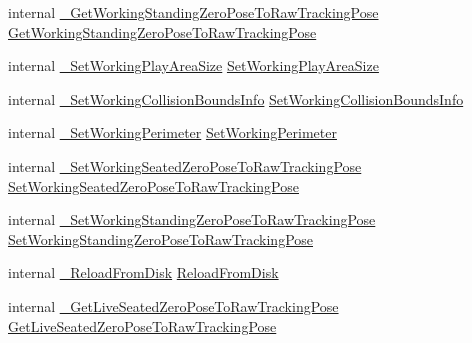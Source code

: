 \begin{DoxyCompactItemize}
internal \mbox{\hyperlink{struct_valve_1_1_v_r_1_1_i_v_r_chaperone_setup_a45b2110871b615dbde696e6f11cfedba}{\+\_\+\+Get\+Working\+Standing\+Zero\+Pose\+To\+Raw\+Tracking\+Pose}} \mbox{\hyperlink{struct_valve_1_1_v_r_1_1_i_v_r_chaperone_setup_a60bd7d96476f3b391250eb3700074fd9}{Get\+Working\+Standing\+Zero\+Pose\+To\+Raw\+Tracking\+Pose}}
\item 
internal \mbox{\hyperlink{struct_valve_1_1_v_r_1_1_i_v_r_chaperone_setup_a554b0b7e6b9be23e238594f517ed9890}{\+\_\+\+Set\+Working\+Play\+Area\+Size}} \mbox{\hyperlink{struct_valve_1_1_v_r_1_1_i_v_r_chaperone_setup_a0f9b6d7a6fbb50e81f9004e19c423327}{Set\+Working\+Play\+Area\+Size}}
\item 
internal \mbox{\hyperlink{struct_valve_1_1_v_r_1_1_i_v_r_chaperone_setup_a1826d10332305d4c90afaf2949c8b5ce}{\+\_\+\+Set\+Working\+Collision\+Bounds\+Info}} \mbox{\hyperlink{struct_valve_1_1_v_r_1_1_i_v_r_chaperone_setup_aa1deb1f74bcff51bfa63537978e51ff0}{Set\+Working\+Collision\+Bounds\+Info}}
\item 
internal \mbox{\hyperlink{struct_valve_1_1_v_r_1_1_i_v_r_chaperone_setup_ad35ac33bfa800e014d9b1a6bac63e1db}{\+\_\+\+Set\+Working\+Perimeter}} \mbox{\hyperlink{struct_valve_1_1_v_r_1_1_i_v_r_chaperone_setup_a5d94d0c27aed104f0fda458684e01da5}{Set\+Working\+Perimeter}}
\item 
internal \mbox{\hyperlink{struct_valve_1_1_v_r_1_1_i_v_r_chaperone_setup_a5190c3da2ff9e625deae3ebdb2deeb0b}{\+\_\+\+Set\+Working\+Seated\+Zero\+Pose\+To\+Raw\+Tracking\+Pose}} \mbox{\hyperlink{struct_valve_1_1_v_r_1_1_i_v_r_chaperone_setup_a229d3d0d3d13769b5623060d2413e363}{Set\+Working\+Seated\+Zero\+Pose\+To\+Raw\+Tracking\+Pose}}
\item 
internal \mbox{\hyperlink{struct_valve_1_1_v_r_1_1_i_v_r_chaperone_setup_a7cc1138b7593b23c7ac311cb1ecacb1f}{\+\_\+\+Set\+Working\+Standing\+Zero\+Pose\+To\+Raw\+Tracking\+Pose}} \mbox{\hyperlink{struct_valve_1_1_v_r_1_1_i_v_r_chaperone_setup_a846b5d6c65aeab963b4c856e9e6c0b28}{Set\+Working\+Standing\+Zero\+Pose\+To\+Raw\+Tracking\+Pose}}
\item 
internal \mbox{\hyperlink{struct_valve_1_1_v_r_1_1_i_v_r_chaperone_setup_aa5b1db0ac77ec3ffab299ca848375c98}{\+\_\+\+Reload\+From\+Disk}} \mbox{\hyperlink{struct_valve_1_1_v_r_1_1_i_v_r_chaperone_setup_a389e7012138dc474386b60abd984aee7}{Reload\+From\+Disk}}
\item 
internal \mbox{\hyperlink{struct_valve_1_1_v_r_1_1_i_v_r_chaperone_setup_a2e6aaeb62d03003acf2b93f46f82c0cf}{\+\_\+\+Get\+Live\+Seated\+Zero\+Pose\+To\+Raw\+Tracking\+Pose}} \mbox{\hyperlink{struct_valve_1_1_v_r_1_1_i_v_r_chaperone_setup_a0639c1537c42116c7948ce51472da542}{Get\+Live\+Seated\+Zero\+Pose\+To\+Raw\+Tracking\+Pose}}

\end{DoxyCompactItemize}
